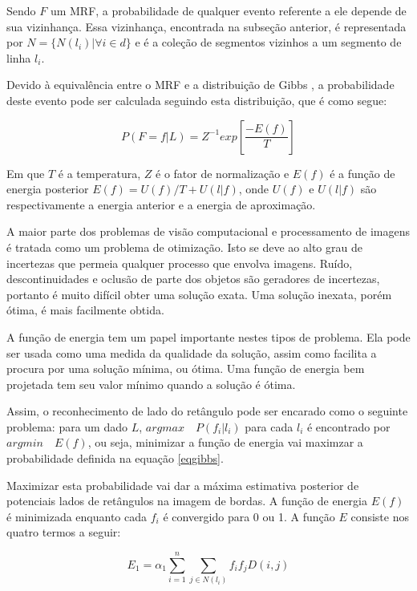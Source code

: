 
Sendo $F$ um MRF, a probabilidade de qualquer evento referente a ele depende de sua vizinhança. Essa vizinhança, encontrada na subseção anterior, é representada por $ N = \{N(l_i)| \forall i \in d\} $ e é a coleção de segmentos vizinhos a um segmento de linha $l_i$. 

Devido à equivalência entre o MRF e a distribuição de Gibbs \cite{mrfgibbs}, a probabilidade deste evento pode ser calculada seguindo esta distribuição, que é como segue:

\begin{equation} \label{eqgibbs}
 P(F = f|L) = Z^{-1} exp[\frac{-E(f)}{T}] 
\end{equation}

Em que $T$ é a temperatura, $Z$ é o fator de normalização e $E(f)$ é a função de energia posterior $ E(f)=U(f)/T+U(l|f) $, onde $U(f)$ e $U(l|f)$ são respectivamente a energia anterior e a energia de aproximação.


A maior parte dos problemas de visão computacional e processamento de imagens é tratada como um problema de otimização\cite{li2009markov}. Isto se deve ao alto grau de incertezas que permeia qualquer processo que envolva imagens. Ruído, descontinuidades e oclusão de parte dos objetos são geradores de incertezas, portanto é muito difícil obter uma solução exata. Uma solução inexata, porém ótima, é mais facilmente obtida.

A função de energia tem um papel importante nestes tipos de problema. Ela pode ser usada como uma medida da qualidade da solução, assim como facilita a procura por uma solução mínima, ou ótima. Uma função de energia bem projetada tem seu valor mínimo quando a solução é ótima.

Assim, o reconhecimento de lado do retângulo pode ser encarado como o seguinte problema: para um dado $L$, $ arg max \quad  P(f_i|l_i) $ para cada $ l_i $ é encontrado por $arg min \quad E(f) $, ou seja, minimizar a função de energia vai maximzar a probabilidade definida na equação \ref{eqgibbs}.

Maximizar esta probabilidade vai dar a máxima estimativa posterior de potenciais lados de retângulos na imagem de bordas. A função de energia $ E(f) $ é minimizada enquanto cada $ f_i $ é convergido para 0 ou 1. A função $ E $ consiste nos quatro termos a seguir:

\begin{equation}
E_1 = \alpha _1 {\sum_{i=1}^{n} {\sum_ {j\in N(l_i)}^{}f_if_jD(i,j)}} \label{e1}
\end{equation}

